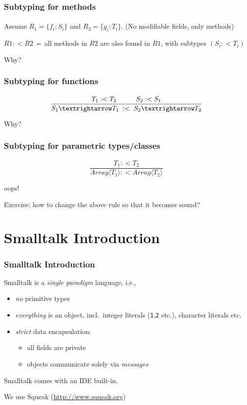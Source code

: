 \documentclass{beamer}
\begin{document}
\begin{frame}
\frametitle{Subtyping for methods}
\framesubtitle{}

Assume $R_1 = \{f_i : S_i\}$ and $R_2 = \{g_i : T_i\}$.
(No modifiable fields, only methods)

$R1 :< R2$ ⇔ all methods in $R2$ are also found in $R1$, with subtypes $(S_i :< T_i)$

Why?

\end{frame}


\begin{frame}
\frametitle{Subtyping for functions}
\framesubtitle{}

\[
\frac{\; T_1 :< T_2 \mbox{\hspace{1cm}}  S_2 :< S_1 \;}{S_1 → T_1 \; :< \; S_2 → T_2}
\]

Why?

\end{frame}


\begin{frame}
\frametitle{Subtyping for parametric types/classes}
\framesubtitle{}

\[
\frac{T_1 :< T_2 }{Array ⟨T_1⟩ :< Array ⟨ T_2 ⟩}
\]

\pause

oops!

\pause

Exercise: how to change the above rule so that it becomes sound?

\end{frame}


\section{Smalltalk Introduction}

\begin{frame}[fragile]
\frametitle{Smalltalk Introduction}

Smalltalk is a \emph{single paradigm} language, i.e.,
\begin{itemize}
  \item \emph{no} primitive types 
  \item \emph{everything} is an object, incl.\ integer
    literals (\texttt{1},\texttt{2} etc.), character literals etc.
  \item \emph{strict} data encapsulation:
    \begin{itemize}
    \item all fields are private
    \item objects communicate solely via \emph{messages}
    \end{itemize}
\end{itemize}

\bigskip\pause

Smalltalk comes with an IDE built-in.

\bigskip

We use Squeak (\url{http://www.squeak.org})

\end{frame}
\end{document}
